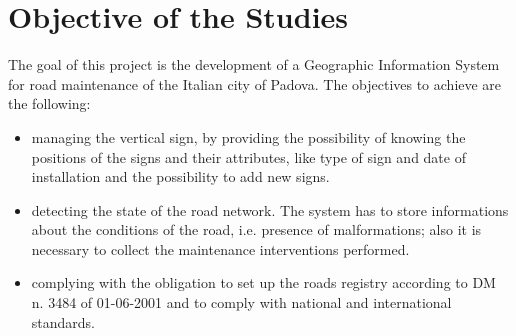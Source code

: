 \section{Objective of the Studies}
The goal of this project is the development of a Geographic Information System for road maintenance of the Italian city of Padova.
The objectives to achieve are the following:
\begin{itemize}
    \item managing the vertical sign, by providing the possibility of knowing the positions of the signs and their attributes, like type of sign and date of installation and the possibility to add new signs.
    \item detecting the state of the road network. The system has to store informations about the conditions of the road, i.e. presence of malformations; also it is necessary to collect the maintenance interventions  performed. 
    \item complying with the obligation to set up the roads registry according to DM n. 3484 of 01-06-2001 and to comply with national and international standards.
\end{itemize}
